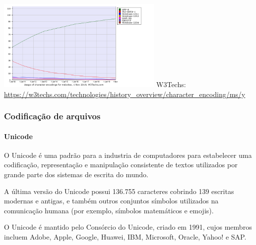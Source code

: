 \begin{frame}[allowframebreaks]
  {
  \centering
  \includegraphics[width=0.6\textwidth,height=0.8\textheight,keepaspectratio]{figures/w3usage.png}
  }
  \footnotesize{W3Techs: \url{https://w3techs.com/technologies/history_overview/character_encoding/ms/y}}
\end{frame}

\begin{frame}
\frametitle{Codificação de arquivos}
\framesubtitle{Unicode}
  O Unicode é uma padrão para a industria de computadores para estabelecer uma 
  codificação, representação e manipulação consistente de textos utilizados por grande parte dos
  sistemas de escrita do mundo.

  A última versão do Unicode possui 136.755 caracteres cobrindo 139 escritas modernas e antigas, 
  e também outros conjuntos símbolos utilizados na comunicação humana (por exemplo, símbolos matemáticos
  e emojis).

  O Unicode é mantido pelo Consórcio do Unicode, criado em 1991, cujos membros incluem Adobe, Apple, Google, Huawei, IBM,
  Microsoft, Oracle, Yahoo! e SAP.
\end{frame}

